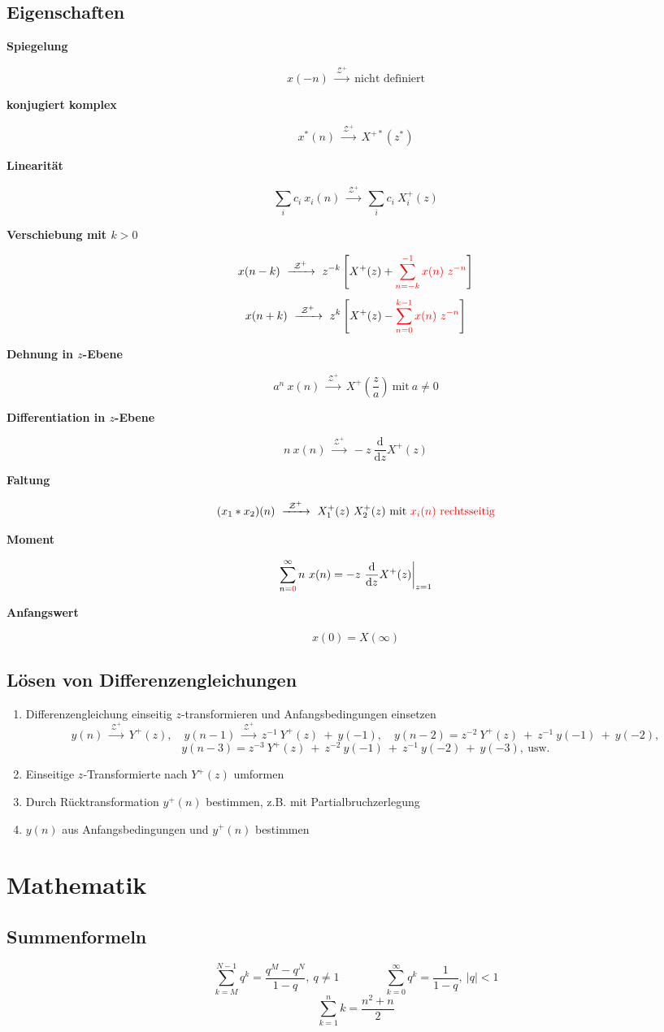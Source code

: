 \documentclass[10pt,a4paper]{article}
\newcommand{\fancyformula}[2]{
	\small\raggedright{\sffamily\textbf{#1}}
	#2
}
\newcommand{\ztransformOneSided}{
	~\xrightarrow{~\mathcal{Z^{+}}~}~
}
\begin{document}
\subsection*{Eigenschaften}
\vspace{-1.5em}
\begin{multicols}{2}
	\fancyformula{Spiegelung}{
 		\[ x(-n) \ztransformOneSided \text{nicht definiert} \]
	}

	\fancyformula{konjugiert komplex}{
		\[ x^{*}(n) \ztransformOneSided X^{+*}(z^{*}) \]
	}

	\fancyformula{Linearität}{
		\[ \sum_i c_i ~ x_i(n) \ztransformOneSided \sum_i c_{i} ~ X^{+}_i(z) \]
	}

	\fancyformula{Verschiebung mit $k > 0$}{
		\[ x(n - k) \ztransformOneSided z^{-k} \left[X^{+}(z) + \textcolor{red}{\sum_{n = -k}^{-1} x(n) ~ z^{-n}}\right] \]
		\[ x(n + k) \ztransformOneSided z^k \left[X^{+}(z) - \textcolor{red}{\sum_{n = 0}^{k-1} x(n) ~ z^{-n}}\right] \]
	}
	\fancyformula{Dehnung in $z$-Ebene}{
		\[ a^n ~ x(n) \ztransformOneSided X^+\left(\frac{z}{a}\right) ~ \text{mit} ~ a \neq 0\]
	}

	\fancyformula{Differentiation in $z$-Ebene}{
		\[ n ~ x(n)\ztransformOneSided -z ~ \frac{\mathrm d}{\mathrm dz} X^+(z) \]
	}

	\fancyformula{Faltung}{
		\[ (x_1 * x_2)(n) \ztransformOneSided X_1^+(z) ~ X_2^+(z) ~ \text{mit \textcolor{red}{$x_{i}(n)$ rechtsseitig}} \]
	}

	\fancyformula{Moment}{
		\[ \sum_{n = \textcolor{red}{0}}^{\infty} n ~ x(n) = -z ~ \frac{\mathrm d}{\mathrm dz} X^{+}(z) \bigg |_{z = 1} \]
	}

	\fancyformula{Anfangswert}{
	\[x(0)=X(\infty)\]
	}
\end{multicols}
\subsection*{Lösen von Differenzengleichungen}
\begin{enumerate}
	\item Differenzengleichung einseitig $z$-transformieren und Anfangsbedingungen einsetzen
	\[
		y(n) \ztransformOneSided Y^+(z), \quad y(n - 1) \ztransformOneSided z^{-1} ~ Y^+(z) ~ + ~ y(-1), \quad y(n - 2) = z^{-2} ~ Y^+(z) ~ + ~ z^{-1} ~ y(-1) ~ + ~ y(-2),
	\]
	\[
		y(n - 3) = z^{-3} ~ Y^+(z) ~ + ~ z^{-2} ~ y(-1) ~ + ~ z^{-1} ~ y(-2) ~ + ~ y(-3), ~ \text{usw.}
	\]
	\item Einseitige $z$-Transformierte nach $Y^+(z)$ umformen
	\item Durch Rücktransformation $y^+(n)$ bestimmen, z.B. mit Partialbruchzerlegung
	\item  $y(n)$ aus Anfangsbedingungen und $y^+(n)$  bestimmen
\end{enumerate}

\section*{Mathematik}
\subsection*{Summenformeln}
\[ \sum_{k = M}^{N - 1} q^k = \frac{q^M - q^N}{1 - q}, ~ q \neq 1  \qquad \qquad \sum_{k = 0}^{\infty} q^k = \frac{1}{1 - q}, ~ |q| < 1 \]
\[ \sum_{k = 1}^{n} k = \frac{n^2 + n}{2} \]
\end{document}

